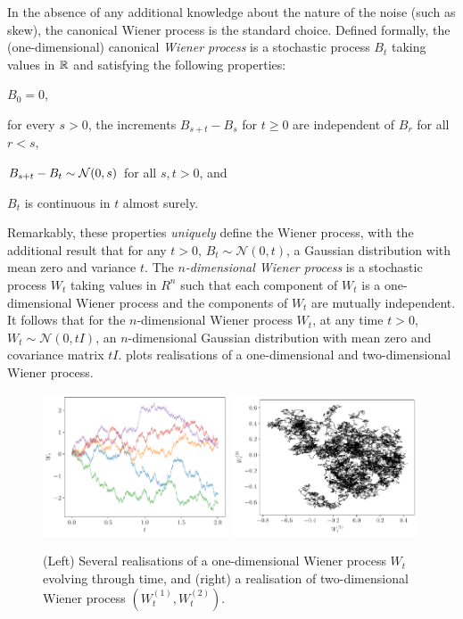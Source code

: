 In the absence of any additional knowledge about the nature of the noise (such as skew), the canonical Wiener process is the standard choice.
Defined formally, the (one-dimensional) canonical \emph{Wiener process} is a stochastic process \(B_t\) taking values in \(\mathbb{R}\) and satisfying the following properties:
\begin{romanate}
	\item \(B_0 = 0\),
	\item for every \(s > 0\), the increments \(B_{s + t} - B_{s}\) for \(t \geq 0\) are independent of \(B_r\) for all \(r < s\),
	\item \(B_{s + t} - B_t \sim\mathcal{N}\!\left(0, s\right)\) for all \(s,t > 0\), and
	\item \(B_t\) is continuous in \(t\) almost surely.
\end{romanate}
Remarkably, these properties \emph{uniquely} define the Wiener process, with the additional result that for any \(t > 0\), \(B_t \sim \mathcal{N}\left(0, t\right)\), a Gaussian distribution with mean zero and variance \(t\).
The \emph{\(n\)-dimensional Wiener process} is a stochastic process \(W_t\) taking values in \(R^n\) such that each component of \(W_t\) is a one-dimensional Wiener process and the components of \(W_t\) are mutually independent.
It follows that for the \(n\)-dimensional Wiener process \(W_t\), at any time \(t > 0\), \(W_t \sim \mathcal{N}\left(0, tI\right)\), an \(n\)-dimensional Gaussian distribution with mean zero and covariance matrix \(tI\).
 plots realisations of a one-dimensional and two-dimensional Wiener process.

\begin{figure}
	\begin{center}
		\includegraphics[width=0.49\textwidth]{figures/wiener_realisations_1d.pdf}
		\includegraphics[width=0.49\textwidth]{figures/wiener_realisations_2d.pdf}
		\caption{(Left) Several realisations of a one-dimensional Wiener process \(W_t\) evolving through time, and (right) a realisation of two-dimensional Wiener process \(\left(W_t^{(1)}, W_t^{(2)}\right)\).}
		\label{fig:wiener_rels}
	\end{center}
\end{figure}


